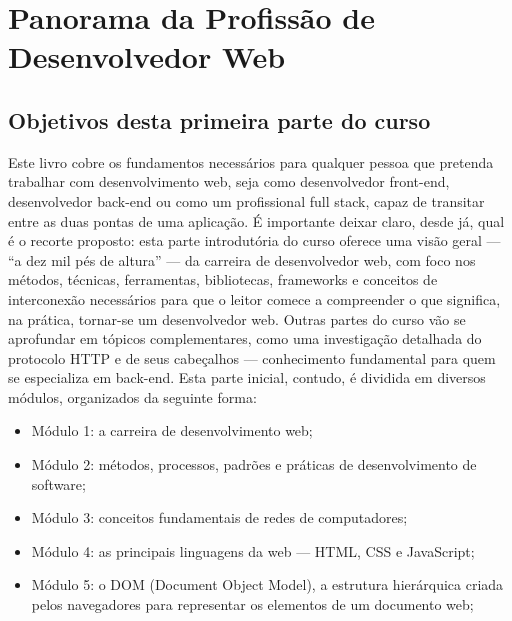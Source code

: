 \chapter{Panorama da Profissão de Desenvolvedor Web}

\section{Objetivos desta primeira parte do curso}

Este livro cobre os fundamentos necessários para qualquer pessoa que pretenda trabalhar com desenvolvimento web, seja como desenvolvedor front-end, desenvolvedor back-end ou como um profissional full stack, capaz de transitar entre as duas pontas de uma aplicação. É importante deixar claro, desde já, qual é o recorte proposto: esta parte introdutória do curso oferece uma visão geral — “a dez mil pés de altura” — da carreira de desenvolvedor web, com foco nos métodos, técnicas, ferramentas, bibliotecas, frameworks e conceitos de interconexão necessários para que o leitor comece a compreender o que significa, na prática, tornar-se um desenvolvedor web. Outras partes do curso vão se aprofundar em tópicos complementares, como uma investigação detalhada do protocolo HTTP e de seus cabeçalhos — conhecimento fundamental para quem se especializa em back-end. Esta parte inicial, contudo, é dividida em diversos módulos, organizados da seguinte forma:

\begin{itemize}
  \item Módulo 1: a carreira de desenvolvimento web;
\end{itemize}

\begin{itemize}
  \item Módulo 2: métodos, processos, padrões e práticas de desenvolvimento de software;
\end{itemize}

\begin{itemize}
  \item Módulo 3: conceitos fundamentais de redes de computadores;
\end{itemize}

\begin{itemize}
  \item Módulo 4: as principais linguagens da web — HTML, CSS e JavaScript;
\end{itemize}

\begin{itemize}
  \item Módulo 5: o DOM (Document Object Model), a estrutura hierárquica criada pelos navegadores para representar os elementos de um documento web;
\end{itemize}

